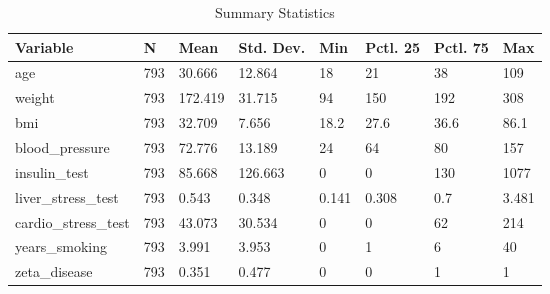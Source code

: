 \documentclass[
]{article}
\begin{document}
\begin{table}

\caption{\label{tab:dataLoad}Summary Statistics}
\centering
\begin{tabular}[t]{llllllll}
\toprule
Variable & N & Mean & Std. Dev. & Min & Pctl. 25 & Pctl. 75 & Max\\
\midrule
age & 793 & 30.666 & 12.864 & 18 & 21 & 38 & 109\\
weight & 793 & 172.419 & 31.715 & 94 & 150 & 192 & 308\\
bmi & 793 & 32.709 & 7.656 & 18.2 & 27.6 & 36.6 & 86.1\\
blood_pressure & 793 & 72.776 & 13.189 & 24 & 64 & 80 & 157\\
insulin_test & 793 & 85.668 & 126.663 & 0 & 0 & 130 & 1077\\
\addlinespace
liver_stress_test & 793 & 0.543 & 0.348 & 0.141 & 0.308 & 0.7 & 3.481\\
cardio_stress_test & 793 & 43.073 & 30.534 & 0 & 0 & 62 & 214\\
years_smoking & 793 & 3.991 & 3.953 & 0 & 1 & 6 & 40\\
zeta_disease & 793 & 0.351 & 0.477 & 0 & 0 & 1 & 1\\
\bottomrule
\end{tabular}
\end{table}
\end{document}
